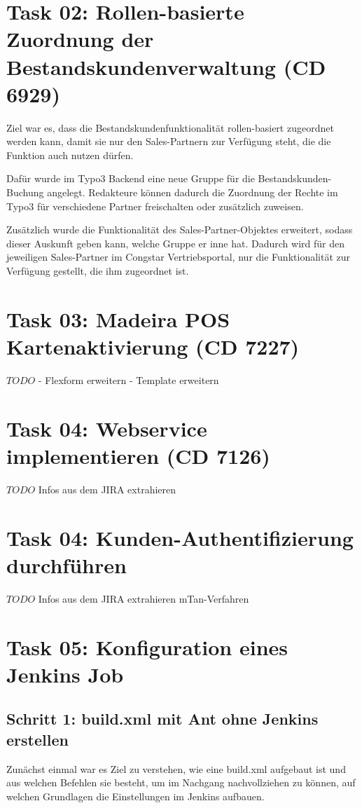 \documentclass[11pt,a4paper]{article} %
\begin{document}
\section{Task 02: Rollen-basierte Zuordnung der Bestandskundenverwaltung (CD 6929)} \label{sec:t02}

Ziel war es, dass die Bestandskundenfunktionalität rollen-basiert zugeordnet werden kann, 
damit sie nur den Sales-Partnern zur Verfügung steht, die die Funktion auch nutzen dürfen.

Dafür wurde im Typo3 Backend eine neue Gruppe für die Bestandskunden-Buchung angelegt.
Redakteure können dadurch die Zuordnung der Rechte im Typo3 für verschiedene Partner freischalten
oder zusätzlich zuweisen.

Zusätzlich wurde die Funktionalität des Sales-Partner-Objektes erweitert, sodass dieser Auskunft geben kann, 
welche Gruppe er inne hat. Dadurch wird für den jeweiligen Sales-Partner im Congstar Vertriebsportal,
nur die Funktionalität zur Verfügung gestellt, die ihm zugeordnet ist.

\section{Task 03: Madeira POS Kartenaktivierung (CD 7227)}

$TODO$
- Flexform erweitern
- Template erweitern

\section{Task 04: Webservice implementieren (CD 7126)}

$TODO$
Infos aus dem JIRA extrahieren

\section{Task 04: Kunden-Authentifizierung durchführen}

$TODO$
Infos aus dem JIRA extrahieren
mTan-Verfahren

\section{Task 05: Konfiguration eines Jenkins Job}

\subsection{Schritt 1: build.xml mit Ant ohne Jenkins erstellen}
Zunächst einmal war es Ziel zu verstehen, wie eine build.xml aufgebaut ist
und aus welchen Befehlen sie besteht, um im Nachgang nachvollziehen zu können, auf welchen
Grundlagen die Einstellungen im Jenkins aufbauen.
\end{document}
